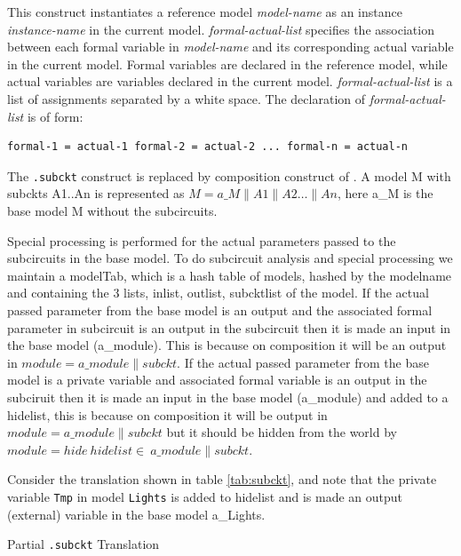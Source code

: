 This construct instantiates a reference model {\em model-name} as
an instance {\em instance-name} in the current model. {\em
formal-actual-list} specifies the association between each formal
variable in {\em model-name} and its corresponding actual variable
in the current model. Formal variables are declared in the
reference model, while actual variables are variables declared in
the current model. {\em formal-actual-list} is a list of
assignments separated by a white space. The declaration of {\em
formal-actual-list} is of form:

\begin{verbatim}
formal-1 = actual-1 formal-2 = actual-2 ... formal-n = actual-n
\end{verbatim}

The {\tt .subckt} construct is replaced by composition construct
of {\rm }. A model M with subckts A1..An is represented as $M =
a\_M \parallel A1 \parallel A2 \ldots \parallel An $, here a\_M is
the base model M without the subcircuits.

Special processing is performed for the actual parameters passed
to the subcircuits in the base model. To do subcircuit analysis
and special processing we maintain a modelTab, which is a hash
table of models, hashed by the modelname and containing the 3
lists, inlist, outlist, subcktlist of the model. If the actual
passed parameter from the base model is an output and the
associated formal parameter in subcircuit is an output in the
subcircuit then it is made an input in the base model (a\_module).
This is because on composition it will be an output in $ module =
a\_module \parallel subckt$. If the actual passed parameter from
the base model is a private variable and associated formal
variable is an output in the subciruit then it is made an input in
the base model (a\_module) and added to a hidelist, this is
because on composition it will be output in $ module = a\_module
\parallel subckt$ but it should be hidden from the world by $
module = hide \ hidelist \in \ a\_module \parallel subckt $.

Consider the translation shown in table \ref{tab:subckt}, and note
that the private variable {\tt Tmp} in model {\tt Lights} is added
to hidelist and is made an output (external) variable in the base
model a\_Lights.

\begin{table}

\hspace{3em}

\caption{Partial {\tt .subckt} Translation}
\label{tab:subckt}
\end{table}

